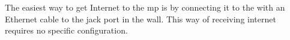 
The easiest way to get Internet to the \gls{mp} is by connecting it to the with an Ethernet cable to the jack port in the wall. This way of receiving internet requires no specific configuration. 


